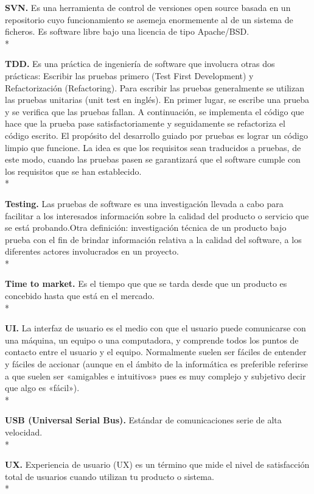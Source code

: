 \documentclass[../pfc.tex]{subfiles}
\begin{document}
	\textbf{SVN.}
	Es una herramienta de control de versiones open source basada en un repositorio cuyo funcionamiento se asemeja enormemente al de un sistema de ficheros. Es software libre bajo una licencia de tipo Apache/BSD.\\*
	
	\textbf{TDD.}
	 Es una práctica de ingeniería de software que involucra otras dos prácticas: Escribir las pruebas primero (Test First Development) y Refactorización (Refactoring). Para escribir las pruebas generalmente se utilizan las pruebas unitarias (unit test en inglés). En primer lugar, se escribe una prueba y se verifica que las pruebas fallan. A continuación, se implementa el código que hace que la prueba pase satisfactoriamente y seguidamente se refactoriza el código escrito. El propósito del desarrollo guiado por pruebas es lograr un código limpio que funcione. La idea es que los requisitos sean traducidos a pruebas, de este modo, cuando las pruebas pasen se garantizará que el software cumple con los requisitos que se han establecido.\\*
	
	\textbf{Testing.}
	Las pruebas de software es una investigación llevada a cabo para facilitar a los interesados información sobre la calidad del producto o servicio que se está probando.Otra definición: investigación técnica de un producto bajo prueba con el fin de brindar información relativa a la calidad del software, a los diferentes actores involucrados en un proyecto.\\*
	
	\textbf{Time to market.}
	Es el tiempo que que se tarda desde que un producto es concebido hasta que está en el mercado.\\*
	
	\textbf{UI.}
	La interfaz de usuario es el medio con que el usuario puede comunicarse con una máquina, un equipo o una computadora, y comprende todos los puntos de contacto entre el usuario y el equipo. Normalmente suelen ser fáciles de entender y fáciles de accionar (aunque en el ámbito de la informática es preferible referirse a que suelen ser «amigables e intuitivos» pues es muy complejo y subjetivo decir que algo es «fácil»).\\*

	\textbf{USB (Universal Serial Bus).}
	Estándar de comunicaciones serie de alta velocidad. \\*
	
	\textbf{UX.}
	Experiencia de usuario (UX) es un término que mide el nivel de satisfacción total de usuarios cuando utilizan tu producto o sistema.\\* 
\end{document}
